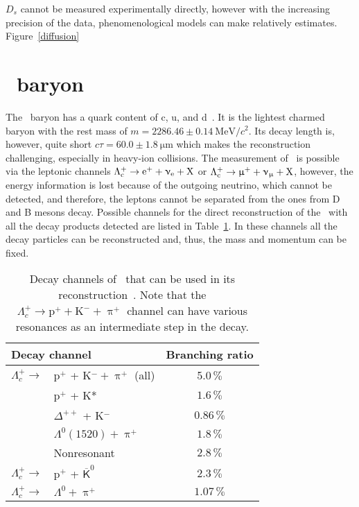 $D_s$ cannot be  measured experimentally directly, however with the increasing precision of the data, phenomenological models can make relatively estimates. Figure~\ref{diffusion}




\nocite{Langevin,LangevinTranslation}



\section{\Lambdac\ baryon}

The \Lambdac\ baryon has a quark content of c, u, and d~\cite{PDG}. It is the lightest charmed baryon with the rest mass of $m = 2286.46 \pm \SI{0.14}{\mega\electronvolt}/c^2$\@. Its decay length is, however, quite short $c\tau = 60.0 \pm \SI{1.8}{\micro\metre}$ which makes the reconstruction challenging, especially in heavy-ion collisions. The measurement of \Lambdac\ is possible via the leptonic channels $\Lambda_\text{c}^+ \rightarrow \mathrm{e}^+ + \upnu_\mathrm{e} + \mathrm{X}$ or $\Lambda_\text{c}^+ \rightarrow \upmu^+ + \upnu_\upmu + \mathrm{X}$, however, the energy information is lost because of the outgoing neutrino, which cannot be detected, and therefore, the leptons cannot be separated from the ones from D and B mesons decay. Possible channels for the direct reconstruction of the \Lambdac\ with all the decay products detected are listed in Table~\ref{tab:lcDecayCahnnels}. In these channels all the decay particles can be reconstructed and, thus, the mass and momentum can be fixed.

\begin{table}[htb]
\caption{\label{tab:lcDecayCahnnels}Decay channels of \Lambdac\ that can be used in its reconstruction~\cite{PDG}. Note that the $\Lambda_c^+ \rightarrow \mathrm{p}^+ + \mathrm{K}^- + \uppi^+$ channel can have various resonances as an intermediate step in the decay.}
\begin{center}
\begin{tabular}{llc}
\toprule
\multicolumn{2}{l}{Decay channel} & Branching ratio  \\
\midrule
$\Lambda_c^+ \rightarrow$ &  p$^+$ + K$^- + \uppi^+$ (all) & 5.0$\,\%$ \\
  & p$^+$ + K* & $1.6\,\%$ \\
  & $\Delta^{++}$ + K$^-$ & $0.86\,\%$ \\
  & $\Lambda^0(1520) + \uppi^+$ & $1.8\,\%$ \\
  & Nonresonant & $2.8\,\%$ \\
$\Lambda_c^+ \rightarrow$ &  p$^+$ + $\overline{\mathsf{K}}^0$ & $2.3\,\% $ \\
$\Lambda_c^+ \rightarrow$ & $ \Lambda^0 + \uppi^+$ & $1.07\,\%$ \\
\bottomrule
\end{tabular}
\end{center}
\end{table}




